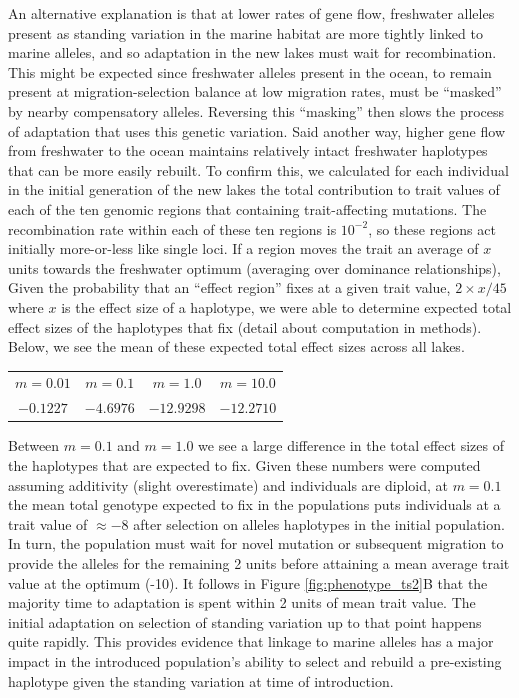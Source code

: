 \documentclass{article}
\begin{document}
An alternative explanation is that at lower rates of gene flow,
freshwater alleles present as standing variation in the marine habitat
are more tightly linked to marine alleles,
and so adaptation in the new lakes must wait for recombination.
This might be expected since freshwater alleles present in the ocean,
to remain present at migration-selection balance at low migration rates,
must be ``masked'' by nearby compensatory alleles.
Reversing this ``masking'' then slows the process of adaptation that uses this genetic variation.
Said another way,
higher gene flow from freshwater to the ocean
maintains relatively intact freshwater haplotypes
that can be more easily rebuilt.
To confirm this, we calculated for each individual in the initial generation of the new lakes
the total contribution to trait values of each of the ten genomic regions 
that containing trait-affecting mutations.
The recombination rate within each of these ten regions is $10^{-2}$,
so these regions act initially more-or-less like single loci.
If a region moves the trait an average of $x$ units towards the freshwater optimum
(averaging over dominance relationships),
Given the probability that an ``effect region'' fixes at a given trait value, 
$2 \times x / 45$ where $x$ is the effect size of a haplotype,
we were able to determine expected total effect sizes of the haplotypes that fix (detail about computation in methods).
Below, we see the mean of these expected total effect sizes across all lakes.

\begin{center}
\begin{tabular}{ | c | c  | c  | c | }
 \hline
 $m = 0.01$ & $m = 0.1$ & $m = 1.0$ & $m = 10.0$ \\ 
 $-0.1227$ &  $-4.6976$ & $-12.9298$  & $-12.2710$\\
 \hline
\end{tabular}
\end{center}

Between $m = 0.1$ and $m = 1.0$ we see a large difference in the total effect sizes of the haplotypes that are expected to fix.
Given these numbers were computed assuming additivity (slight overestimate) and individuals are diploid,
at $m = 0.1$ the mean total genotype expected to fix in the populations puts individuals at a trait value of $\approx -8$ 
after selection on alleles haplotypes in the initial population. 
In turn, the population must wait for novel mutation or subsequent migration to provide the alleles for the remaining 2 units before 
attaining a mean average trait value at the optimum (-10).
It follows in Figure \ref{fig:phenotype_ts2}B that the majority time to adaptation is spent within 2 units of mean trait value.
The initial adaptation on selection of standing variation up to that point happens quite rapidly.
This provides evidence that linkage to marine alleles has a major impact in the introduced population's ability 
to select and rebuild a pre-existing haplotype given the standing variation at time of introduction. 
\end{document}
